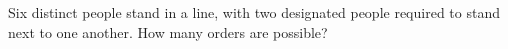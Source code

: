 Six distinct people stand in a line, with two designated people required to stand next to one another. How many orders are possible?
